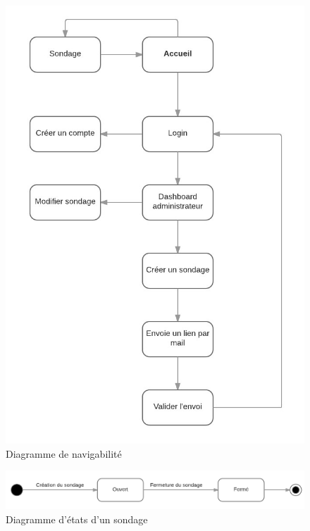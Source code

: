 \documentclass[titlepage]{report}
\begin{document}
\begin{figure}[h]
	\caption{Diagramme de navigabilité}
	\label{annexe_diagramme_navigabilite}
	\centering
	\includegraphics[scale=1]{figures/diagrammes/navigabilite.png}
\end{figure}

\begin{figure}[h]
	\caption{Diagramme d'états d'un sondage}
	\label{annexe_diagramme_etat}
	\centering
	\includegraphics[width=\textwidth]{figures/diagrammes/etat.png}
\end{figure}

\clearpage
\end{document}

